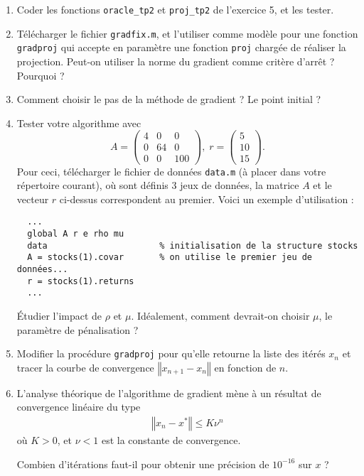 \documentclass[10pt,a4paper,fleqn]{report}
\begin{document}
\begin{enumerate}
\item Coder les fonctions \verb+oracle_tp2+ et \verb+proj_tp2+
    de l'exercice 5, et les tester.
\item Télécharger le fichier \verb+gradfix.m+, et l'utiliser comme
  modèle pour une fonction \verb+gradproj+ qui accepte en paramètre
  une fonction \verb+proj+ chargée de réaliser la projection.
  Peut-on utiliser la norme du gradient comme critère d'arrêt ? Pourquoi ?
\item Comment choisir le pas de la méthode de gradient ? Le point
  initial ?
\item Tester votre algorithme avec
    \[A =
  \begin{pmatrix}
    4&0&0\\0&64&0\\0&0&100
  \end{pmatrix},\;r =
  \begin{pmatrix}
    5\\10\\15
  \end{pmatrix}.\]
  Pour ceci, télécharger le fichier de données \verb+data.m+ (à placer dans votre répertoire
  courant), où sont définis 3 jeux de données, la matrice $A$ et le vecteur $r$ ci-dessus
  correspondent au premier. Voici un exemple d'utilisation :
  \begin{verbatim}
  ...
  global A r e rho mu
  data                      % initialisation de la structure stocks
  A = stocks(1).covar       % on utilise le premier jeu de données...
  r = stocks(1).returns
  ...
  \end{verbatim}

  Étudier l'impact de $\rho$ et $\mu$. Idéalement, comment devrait-on choisir $\mu$, le paramètre de
  pénalisation ?
\item Modifier la procédure \verb+gradproj+ pour qu'elle retourne la
  liste des itérés $x_{n}$ et tracer la courbe de convergence
  $\left\Vert x_{n+1} - x_{n}\right\Vert$ en fonction de $n$.
\item L'analyse théorique de l'algorithme de gradient mène à un
  résultat de convergence linéaire du type
  \begin{align*}
    \left\Vert x_{n} - x^{*}\right\Vert \leq K \nu^{n}
  \end{align*}
  où $K > 0$, et $\nu < 1$ est la constante de convergence.

  Combien d'itérations faut-il pour obtenir une précision de
  $10^{-16}$ sur $x$ ?


\end{enumerate}
\end{document}
